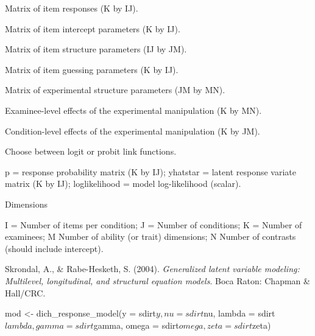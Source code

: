 \documentclass[a4paper]{book}
\begin{document}
\begin{Arguments}
\begin{ldescription}
\item[\code{y}] Matrix of item responses (K by IJ).

\item[\code{nu}] Matrix of item intercept parameters (K by IJ).

\item[\code{lambda}] Matrix of item structure parameters (IJ by JM).

\item[\code{kappa}] Matrix of item guessing parameters (K by IJ).

\item[\code{gamma}] Matrix of experimental structure parameters (JM by MN).

\item[\code{omega}] Examinee-level effects of the experimental manipulation (K by
MN).

\item[\code{zeta}] Condition-level effects of the experimental manipulation (K by
JM).

\item[\code{link}] Choose between logit or probit link functions.
\end{ldescription}
\end{Arguments}
%
\begin{Value}
p = response probability matrix (K by IJ); yhatstar = latent response
variate matrix (K by IJ); loglikelihood = model log-likelihood (scalar).
\end{Value}
%
\begin{Section}{Dimensions}

I = Number of items per condition; J = Number of conditions; K = Number of
examinees; M Number of ability (or trait) dimensions; N Number of contrasts
(should include intercept).
\end{Section}
%
\begin{References}\relax
Skrondal, A., \& Rabe-Hesketh, S. (2004). \emph{Generalized latent variable
modeling: Multilevel, longitudinal, and structural equation models}. Boca
Raton: Chapman \& Hall/CRC.
\end{References}
%
\begin{Examples}
\begin{ExampleCode}
mod <- dich_response_model(y = sdirt$y, nu = sdirt$nu, lambda = sdirt$lambda,
                     gamma = sdirt$gamma, omega = sdirt$omega,
                     zeta = sdirt$zeta)

\end{ExampleCode}
\end{Examples}
\end{document}
